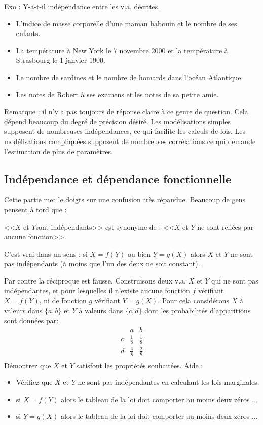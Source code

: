 \documentclass{article}
\begin{document}
Exo : Y-a-t-il indépendance entre les v.a. décrites. 
\begin{itemize}
\item L'indice de masse corporelle d'une maman babouin et le nombre de ses enfants.  
\item   La température à New York le 7 novembre 2000 et la température à Strasbourg le 1 janvier 1900. 
\item Le nombre de sardines et le nombre de homards dans l'océan Atlantique. 
\item Les notes de Robert à ses examens et  les notes de sa petite amie.   
\end{itemize}
Remarque : il n'y a pas toujours de réponse claire à ce genre de question. Cela dépend beaucoup du degré de précision désiré. Les modélisations simples supposent de nombreuses indépendances, ce qui facilite les calculs de lois. Les modélisations compliquées  supposent de nombreuses corrélations ce qui demande l'estimation de plus de paramètres. 



\subsection{Indépendance et dépendance fonctionnelle}

Cette partie  met le doigts sur une confusion très répandue.  Beaucoup de gens pensent à tord que :

<<$X$ et $Y$sont indépendants>>  \newline
est  synonyme de : \newline
 <<$X$ et $Y$ ne sont reliées par aucune fonction>>. 



C'est vrai dans un sens :  si $X=f(Y)$ ou bien $Y=g(X)$ alors $X$ et $Y$ ne sont pas indépendants (à moins que l'un des deux ne soit constant). 

Par contre la réciproque  est fausse. Construisons deux v.a. $X$ et $Y$ qui ne sont pas indépendantes, et pour lesquelles il n'existe aucune fonction  $f$ vérifiant $X=f(Y)$, ni de fonction $g$ vérifiant $Y=g(X)$. Pour cela considérons $X$ à valeurs dans $\{a,b\}$ et $Y$ à valeurs dans $\{c,d\}$ dont les probabilités d'apparitions sont données par:
$$
\begin{array}{c|c|c}
	& a & b  \\
	\hline
c	& \frac 18 & \frac 18 \\
\hline
d	& \frac 48 & \frac 2 8 \\
\end{array}
$$
Démontrez que $X$ et $Y$ satisfont les propriétés souhaitées. 
Aide : 
\begin{itemize}
\item Vérifiez que $X$ et $Y$ ne sont pas indépendantes en calculant les lois marginales. 
\item  si $X=f(Y)$ alors le tableau de la loi doit comporter au moins  deux  zéros  ... 
\item si $Y=g(X)$ alors le tableau de la loi doit comporter au moins  deux zéros ... 
\end{itemize}
\end{document}
